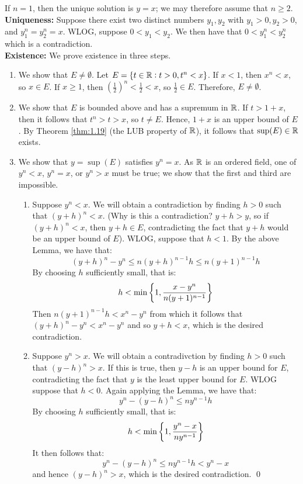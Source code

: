 \begin{nproof}
    If $n = 1$, then the unique solution is $y = x$; we may therefore assume that $n \geq 2$.
    \\ \textbf{Uniqueness:} Suppose there exist two distinct numbers $y_1, y_2$ with $y_1 > 0, y_2 > 0$, and $y_1^n = y_2^n = x$. WLOG, suppose $0 < y_1 < y_2$. We then have that $0 < y_1^n < y_2^n$ which is a contradiction. 
    \\ \textbf{Existence:} We prove existence in three steps.
    \begin{enumerate}[1.]
        \item We show that $E \neq \emptyset$. Let $E = \set{t \in \mathbb{R}: t > 0, t^n < x}$. If $x < 1$, then $x^n < x$, so $x \in E$. If $x \geq 1$, then $\left(\frac{1}{2}\right)^n < \frac{1}{2} < x$, so $\frac{1}{2} \in E$. Therefore, $E \neq \emptyset$.
        \item We show that $E$ is bounded above and has a supremum in $\mathbb{R}$. If $t > 1 + x$, then it follows that $t^n > t > x$, so $t \neq E$. Hence, $1 + x$ is an upper bound of $E$. By Theorem \ref{thm:1.19} (the LUB property of $\mathbb{R}$), it follows that $\sup(E) \in \mathbb{R}$ exists. 
        \item We show that $y = \sup(E)$ satisfies $y^n = x$. As $\mathbb{R}$ is an ordered field, one of $y^n < x$, $y^n = x$, or $y^n > x$ must be true; we show that the first and third are impossible.
        \begin{enumerate}
            \item Suppose $y^n < x$. We will obtain a contradiction by finding $h > 0$ such that $(y+h)^n < x$. (Why is this a contradiction? $y+ h > y$, so if $(y+h)^n < x$, then $y + h \in E$, contradicting the fact that $y + h$ would be an upper bound of $E$). WLOG, suppose that $h < 1$. By the above Lemma, we have that:
            \[(y+h)^n - y^n \leq n(y+h)^{n-1}h \leq n(y+1)^{n-1}h\]
            By choosing $h$ sufficiently small, that is:
            \[h < \min\set{1, \frac{x-y^n}{n(y+1)^{n-1}}}\]
            Then $n(y+1)^{n-1}h < x^n - y^n$ from which it follows that $(y+h)^n - y^n < x^n - y^n$ and so $y+h < x$, which is the desired contradiction.
            \item Suppose $y^n > x$. We will obtain a contradivction by finding $h > 0$ such that $(y-h)^n > x$. If this is true, then $y-h$ is an upper bound for $E$, contradicting the fact that $y$ is the least upper bound for $E$. WLOG suppose that $h < 0$. Again applying the Lemma, we have that:
            \[y^n - (y-h)^n \leq ny^{n-1}h\]
            By choosing $h$ sufficiently small, that is:
            \[h < \min\set{1, \frac{y^n-x}{ny^{n-1}}}\]
            It then follows that:
            \[y^n - (y-h)^n \leq ny^{n-1}h < y^n - x\]
            and hence $(y-h)^n > x$, which is the desired contradiction. \qed
        \end{enumerate} 
    \end{enumerate}
\end{nproof}
